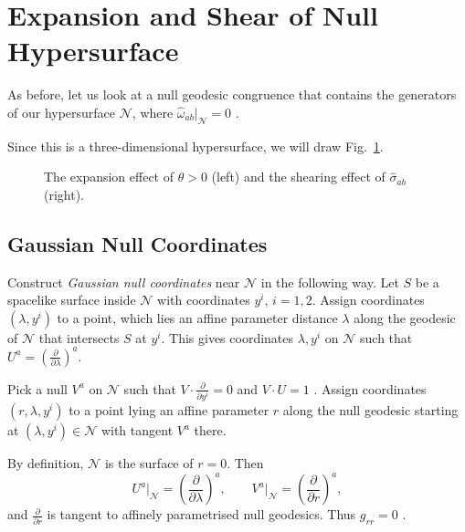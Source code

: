 
\section{Expansion and Shear of Null Hypersurface}%
\label{sec:expansion_and_shear_of_null_hypersurface}

As before, let us look at a null geodesic congruence that contains the generators of our hypersurface $\mathcal{N}$, where $\hat{\omega}_{ab} \rvert_\mathcal{N} = 0$ .

Since this is a three-dimensional hypersurface, we will draw Fig.~\ref{fig:l10f1}.
\begin{figure}[tbhp]
  \centering
  \def\svgwidth{0.8\columnwidth}
  
  \caption{The expansion effect of $\theta > 0$ (left) and the shearing effect of $\hat{\sigma}_{ab}$ (right).}
  \label{fig:l10f1}
\end{figure}

\subsection{Gaussian Null Coordinates}%
\label{sub:gaussian_null_coordinates}

Construct \emph{Gaussian null coordinates} near $\mathcal{N}$ in the following way.
Let $S$ be a spacelike surface inside $\mathcal{N}$ with coordinates $y^{i}$, $i = 1, 2$.
Assign coordinates $(\lambda , y^i)$ to a point, which lies an affine parameter distance $\lambda$ along the geodesic of $\mathcal{N}$ that intersects $S$ at $y^i$.
This gives coordinates $\lambda, y^i$ on $\mathcal{N}$ such that $U^a = \left( \frac{\partial }{\partial \lambda} \right)^a$.

Pick a null $V^a$ on $\mathcal{N}$ such that $V \cdot \frac{\partial}{\partial y^i} = 0$ and $V \cdot U = 1$ .
Assign coordinates $(r, \lambda, y^i)$  to a point lying an affine parameter $r$  along the null geodesic starting at $(\lambda, y^i) \in \mathcal{N}$  with tangent $V^a$ there.

By definition,  $\mathcal{N}$  is the surface of $r = 0$. Then 
 \begin{equation}
   U^a \rvert_\mathcal{N} = \left(\frac{\partial }{\partial \lambda} \right)^a, \qquad V^a\vert_\mathcal{N} = \left( \frac{\partial }{\partial r} \right)^a,
\end{equation}
and $\frac{\partial }{\partial r}$  is tangent to affinely parametrised null geodesics. Thus  $g_{rr} = 0$ .

